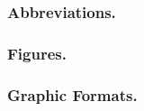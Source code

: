 \documentclass[letterpaper, preprint, paper,11pt]{AAS}	%
\begin{document}
\subsubsection{Abbreviations.}
%
%
%
%

\subsubsection{Figures.}   


\subsubsection{Graphic Formats.} 
\end{document}
